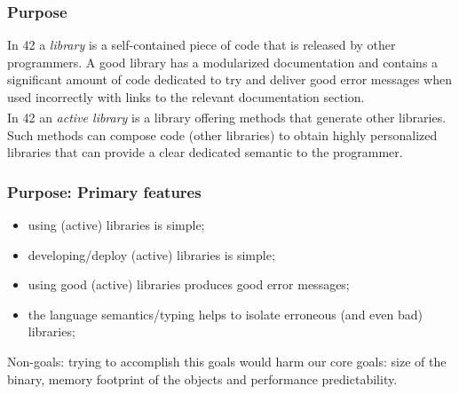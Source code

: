 \begin{frame}[fragile]
\frametitle{Purpose}
In 42 a \emph{library} is a self-contained piece of code that is released
by other programmers.
A good library has a modularized documentation and 
contains a significant amount of code dedicated to try and
deliver good error messages when used incorrectly with links to the relevant documentation section.
\\${}_{}$\\
In 42 an \emph{active library} is a library offering methods that generate other libraries.
Such methods can compose code (other libraries) to obtain highly personalized libraries that can provide a clear dedicated semantic to the programmer.
\end{frame}

\begin{frame}[fragile]
\frametitle{Purpose: Primary features}
\begin{itemize}
\item  using (active) libraries is simple;

\item  developing/deploy (active) libraries is simple;

\item  using good (active) libraries produces good error messages;

\item  the language semantics/typing  helps to isolate erroneous (and even bad) libraries;

\end{itemize}
\begin{Scaled}{0.8}{0.8}
\parbox{\linewidth}{
Non-goals: trying to accomplish this goals would harm our core goals:
size of the binary,
memory footprint of the objects and performance predictability.}
\end{Scaled}
\end{frame}




